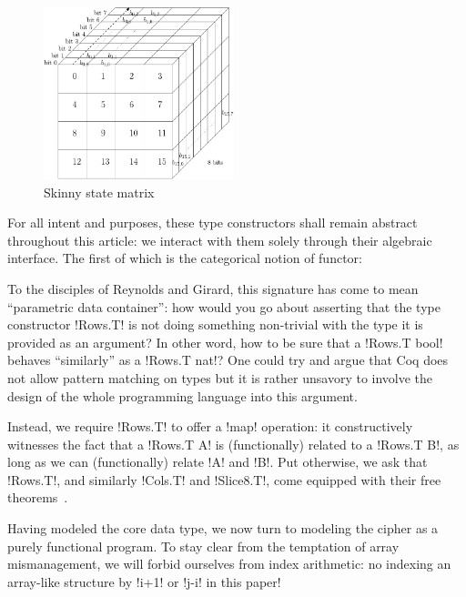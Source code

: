 \documentclass[draft,english]{jflart}
\begin{document}
\begin{figure}
  \begin{center}
    \includegraphics[draft=false,height=5cm]{skinny_state}
  \end{center}
  \caption{Skinny state matrix}
  \label{fig:state}
\end{figure}



For all intent and purposes, these type constructors shall remain
abstract throughout this article: we interact with them solely through
their algebraic interface. The first of which is the categorical
notion of functor:
%

To the disciples of Reynolds and Girard, this signature has come to
mean ``parametric data container'': how would you go about asserting
that the type constructor \coqe!Rows.T! is not doing something
non-trivial with the type it is provided as an argument? In other
word, how to be sure that a \coqe!Rows.T bool! behaves ``similarly''
as a \coqe!Rows.T nat!? One could try and argue that Coq does not
allow pattern matching on types but it is rather unsavory to involve
the design of the whole programming language into this argument.

Instead, we require \coqe!Rows.T! to offer a \coqe!map! operation: it
constructively witnesses the fact that a \coqe!Rows.T A! is
(functionally) related to a \coqe!Rows.T B!, as long as we can
(functionally) relate \coqe!A! and \coqe!B!. Put otherwise, we ask
that \coqe!Rows.T!, and similarly \coqe!Cols.T! and \coqe!Slice8.T!,
come equipped with their free theorems~\citep{wadler:free-theorem}.


Having modeled the core data type, we now turn to modeling the cipher
as a purely functional program. To stay clear from the temptation of
array mismanagement, we will forbid ourselves from index arithmetic:
no indexing an array-like structure by \coqe!i+1! or \coqe!j-i! in
this paper!
\end{document}
